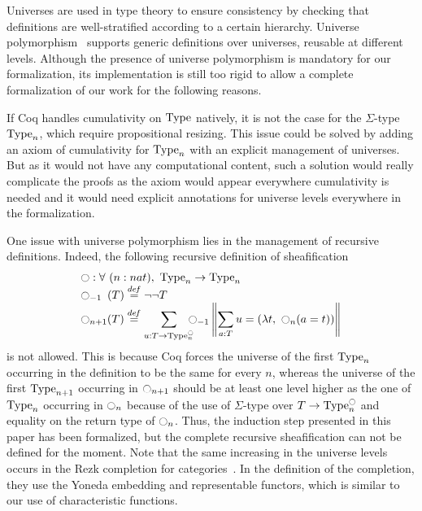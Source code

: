 Universes are used in type theory to ensure consistency by checking
that definitions are well-stratified according to a certain hierarchy.
%
Universe polymorphism~\cite{sozeau2014universe} supports generic
definitions over universes, reusable at different levels.
%
Although the presence of universe polymorphism is mandatory for our
formalization, its implementation is still too rigid to allow a
complete formalization of our work for the following reasons.

%
If Coq handles cumulativity on $\operatorname{Type}$ natively, it is not
the case for the $\Sigma$-type $\operatorname{Type}_n$, which require propositional
resizing. 
%
This issue could be solved by adding an axiom of cumulativity
for $\operatorname{Type}_n$ with an explicit management of universes. 
%
But as it would not have any computational content, such a solution
would really complicate the proofs as the axiom would appear
everywhere cumulativity is needed and it would need explicit
annotations for universe levels everywhere in the formalization.
%

One issue with universe polymorphism lies in the management of
recursive definitions. Indeed, the following recursive definition of
sheafification
%
\[ \begin{array}{l}
   \ocircle : \forall \ (n : nat), \ \operatorname{Type}_n \to \operatorname{Type}_n 
   \\
    \ocircle_{-1\phantom{n}}(T) \overset{de\hspace{-0.2ex}f}{=}\lnot\lnot T \\

      \displaystyle{\ensuremath{\ocircle}_{n+1}(T)} \overset{de\hspace{-0.2ex}f}{=}  
      \displaystyle{\sum_{u:T \to \operatorname{Type}_n^{\ensuremath{\ocircle}}} \!\!\!\!\ensuremath{\ocircle}_{-1} 
      \left\|
      \sum_{a:T} u= (\lambda t,~\ensuremath{\ocircle}_n (a=t))
      \right\|}
    \end{array}
\]
%
is not allowed. 
%
This is because Coq forces the universe of the first $\operatorname{Type}_n$
occurring in the definition to be the same for every $n$, whereas the
universe of the first $\operatorname{Type}_{n+1}$ occurring in $\ocircle_{n+1}$ should be at
least one level higher as the one of $\operatorname{Type}_n$ occurring in
$\ocircle_{n}$ because of the use of $\Sigma$-type over
$T \to \operatorname{Type}_n^{\ocircle}$ and equality on the return type of $\ocircle_n$.
%
%
Thus, the induction step presented in this paper has been formalized,
but the complete recursive sheafification can not be defined for the
moment.
%
Note that the same increasing in the universe levels occurs in the
Rezk completion for categories~\cite{rezk}. In the definition of the
completion, they use the Yoneda embedding and representable functors,
which is similar to our use of characteristic functions.
 
